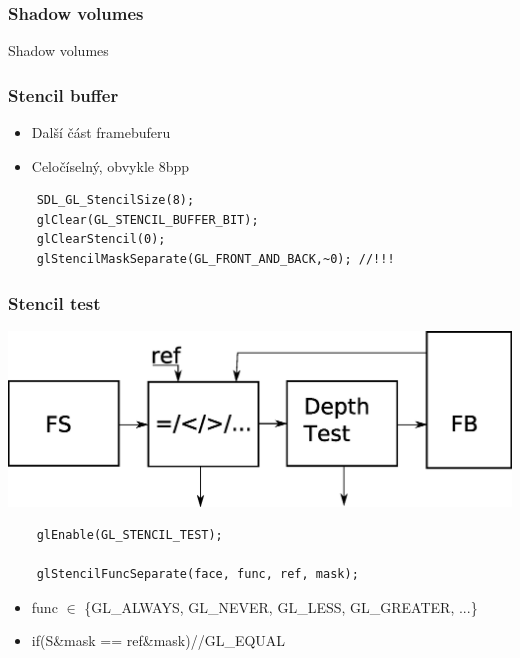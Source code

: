 \begin{frame}
  \frametitle{Shadow volumes}
  \begin{center}
    \Huge {\color{white}Shadow volumes}
  \end{center}
\end{frame}

\begin{frame}[fragile]
  \frametitle{Stencil buffer}

  \begin{itemize}
    \item Další část framebuferu
    \item Celočíselný, obvykle 8bpp
  \end{itemize}
  \vfill

  \begin{verbatim}
    SDL_GL_StencilSize(8);
    glClear(GL_STENCIL_BUFFER_BIT);
    glClearStencil(0);
    glStencilMaskSeparate(GL_FRONT_AND_BACK,~0); //!!!
  \end{verbatim}
\end{frame}

\begin{frame}[fragile]
  \frametitle{Stencil test}

  \includegraphics[width=\textwidth]{pics/shadows/shadowVolumes/stencil-test.eps}

  \vfill

  \begin{verbatim}
    glEnable(GL_STENCIL_TEST);

    glStencilFuncSeparate(face, func, ref, mask);
  \end{verbatim}

  \vfill
  \begin{itemize}
    \item func $\in$ \{GL\_ALWAYS, GL\_NEVER, GL\_LESS, GL\_GREATER, ...\}
    \item if(S\&mask == ref\&mask)//GL\_EQUAL
  \end{itemize}
\end{frame}


